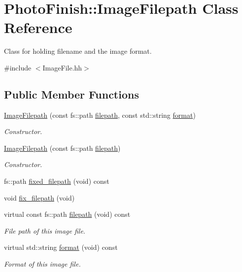\hypertarget{class_photo_finish_1_1_image_filepath}{}\section{Photo\+Finish\+:\+:Image\+Filepath Class Reference}
\label{class_photo_finish_1_1_image_filepath}


Class for holding filename and the image format.  




{\ttfamily \#include $<$Image\+File.\+hh$>$}

\subsection*{Public Member Functions}
\begin{DoxyCompactItemize}
\item 
\hyperlink{class_photo_finish_1_1_image_filepath_aae5f02530cacc69824458e02b8eac08d}{Image\+Filepath} (const fs\+::path \hyperlink{class_photo_finish_1_1_image_filepath_ae9e93bc121205dbc65545e43a58a22a2}{filepath}, const std\+::string \hyperlink{class_photo_finish_1_1_image_filepath_a8ab0726533af5d526fd077cd82f67020}{format})
\begin{DoxyCompactList}\small\item\em Constructor. \end{DoxyCompactList}\item 
\hyperlink{class_photo_finish_1_1_image_filepath_a7fb4ce09dba96f24ae704a27e9ef436e}{Image\+Filepath} (const fs\+::path \hyperlink{class_photo_finish_1_1_image_filepath_ae9e93bc121205dbc65545e43a58a22a2}{filepath})
\begin{DoxyCompactList}\small\item\em Constructor. \end{DoxyCompactList}\item 
fs\+::path \hyperlink{class_photo_finish_1_1_image_filepath_ad3a3dc3f321bfc28e924ba4bc8ebcd71}{fixed\+\_\+filepath} (void) const
\item 
void \hyperlink{class_photo_finish_1_1_image_filepath_ab9dd1dbd29cf06bac332e9af808c900b}{fix\+\_\+filepath} (void)
\item 
virtual const fs\+::path \hyperlink{class_photo_finish_1_1_image_filepath_ae9e93bc121205dbc65545e43a58a22a2}{filepath} (void) const
\begin{DoxyCompactList}\small\item\em File path of this image file. \end{DoxyCompactList}\item 
virtual std\+::string \hyperlink{class_photo_finish_1_1_image_filepath_a8ab0726533af5d526fd077cd82f67020}{format} (void) const
\begin{DoxyCompactList}\small\item\em Format of this image file. \end{DoxyCompactList}\end{DoxyCompactItemize}
